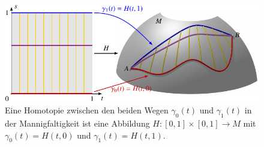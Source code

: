 %
%
%
\begin{figure}
\centering
\includegraphics{chapters/040-green/images/homotopie.pdf}
\caption{Eine Homotopie zwischen den beiden Wegen $\gamma_0(t)$
und $\gamma_1(t)$ in der Mannigfaltigkeit ist eine Abbildung
$H\colon [0,1]\times[0,1]\to M$ mit $\gamma_0(t)=H(t,0)$ und
$\gamma_1(t) = H(t,1)$.
\label{buch:green:fig:homotopie}}
\end{figure}
